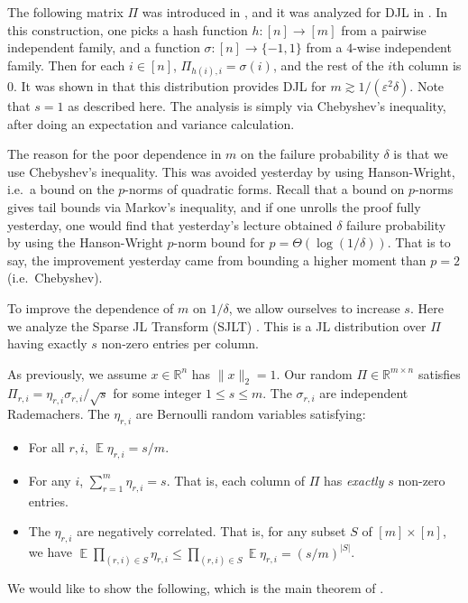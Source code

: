 \documentclass[12pt]{article}
\DeclareMathOperator*{\E}{\mathbb{E}}
\newcommand{\eps}{\varepsilon}
\newcommand{\R}{\mathbb{R}}
\begin{document}
The following matrix $\Pi$ was introduced in \cite{CharikarCF04}, and it was analyzed for DJL in \cite{ThorupZ12}. In this construction, one picks a hash function $h:[n]\rightarrow[m]$ from a pairwise independent family, and a function $\sigma:[n]\rightarrow\{-1,1\}$ from a $4$-wise independent family. Then for each $i\in[n]$, $\Pi_{h(i), i} = \sigma(i)$, and the rest of the $i$th column is $0$. It was shown in \cite{ThorupZ12} that this distribution provides DJL for $m \gtrsim 1/(\eps^2\delta)$. Note that $s = 1$ as described here. The analysis is simply via Chebyshev's inequality, after doing an expectation and variance calculation.

The reason for the poor dependence in $m$ on the failure probability $\delta$ is that we use Chebyshev's inequality. This was avoided yesterday by using Hanson-Wright, i.e.\ a bound on the $p$-norms of quadratic forms. Recall that a bound on $p$-norms gives tail bounds via Markov's inequality, and if one unrolls the proof fully yesterday, one would find that yesterday's lecture obtained $\delta$ failure probability by using the Hanson-Wright $p$-norm bound for $p = \Theta(\log(1/\delta))$. That is to say, the improvement yesterday came from bounding a higher moment than $p=2$ (i.e.\ Chebyshev).

To improve the dependence of $m$ on $1/\delta$, we allow ourselves to increase $s$. Here we analyze the Sparse JL Transform (SJLT) \cite{KaneN14}. This is a JL distribution over $\Pi$ having exactly $s$ non-zero entries per column. 

As previously, we assume $x\in\R^n$ has $\|x\|_2 = 1$. Our random $\Pi\in\R^{m\times n}$ satisfies $\Pi_{r,i} = \eta_{r,i} \sigma_{r,i} / \sqrt{s}$ for some integer $1\le s \le m$. The $\sigma_{r,i}$ are independent Rademachers. The $\eta_{r,i}$ are Bernoulli random variables satisfying:
\begin{itemize}
\item For all $r, i$,  $\E \eta_{r,i} = s/m$.
\item For any $i$, $\sum_{r=1}^m \eta_{r,i} = s$. That is, each column of $\Pi$ has {\it exactly} $s$ non-zero entries.
\item The $\eta_{r,i}$ are negatively correlated. That is, for any subset $S$ of $[m]\times [n]$, we have $\E\prod_{(r,i) \in S} \eta_{r,i} \le \prod_{(r,i)\in S} \E \eta_{r,i} = (s/m)^{|S|}$.
\end{itemize}

We would like to show the following, which is the main theorem of \cite{KaneN14}.
\end{document}
